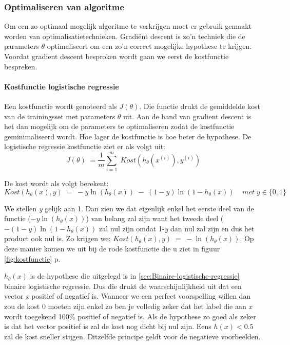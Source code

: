 \subsubsection{Optimaliseren van algoritme}
\label{sec:Optimaliseren-algoritme}
Om een zo optimaal mogelijk algoritme te verkrijgen moet er gebruik gemaakt worden van optimalisatietechnieken. Gradiënt descent is zo'n techniek die de parameters $\theta$ optimaliseert om een zo'n correct mogelijke hypothese te krijgen. Voordat gradient descent besproken wordt gaan we eerst de kostfunctie bespreken. 

\paragraph{Kostfunctie logistische regressie}
\label{par:kostfunctie-log}
Een kostfunctie wordt genoteerd als $J(\theta)$. Die functie drukt de gemiddelde kost van de trainingsset met parameters $\theta$ uit. Aan de hand van gradient descent is het dan mogelijk om de parameters te optimaliseren zodat de kostfunctie geminimaliseerd wordt. Hoe lager de kostfunctie is hoe beter de hypothese.
De logistische regressie kostfunctie ziet er als volgt uit: 
$$ 
J(\theta) \; = \frac{1}{m}\sum_{i=1}^{m} \;   Kost (h_{\theta}(x^{(i)}), y^{(i)} )  
$$

De kost wordt als volgt berekent:
$$Kost (h_{\theta}(x), y) \; = \; -y\ln(h_{\theta}(x)) \;- \;(1-y) \ln(1-h_{\theta}(x))  \;\;\;\; met \; y \in \{0,1\}$$

We stellen \textit{y} gelijk aan 1. Dan zien we dat eigenlijk enkel het eerste deel van de functie ($-y\ln(h_{\theta}(x))$) van belang zal zijn want het tweede deel ($- (1-y) \ln(1-h_{\theta}(x))$ zal nul zijn omdat 1-\textit{y} dan nul zal zijn en dus het product ook nul is. Zo krijgen we: 
\newline $Kost (h_{\theta}(x), y) \; = \; -\ln(h_{\theta}(x))$. Op deze manier komen we uit bij de rode kostfunctie die u ziet in figuur \ref{fig:kostfunctie} p\pageref{fig:kostfunctie}.

$h_{\theta}(x)$ is de hypothese die uitgelegd is in \ref{sec:Binaire-logistische-regressie} binaire logistische regressie. Dus die drukt de waarschijnlijkheid uit dat een vector \textit{x} positief of negatief is. Wanneer we een perfect voorspelling willen dan zou de kost 0 moeten zijn enkel zo ben je volledig zeker dat het label die aan \textit{x} wordt toegekend 100\% positief of negatief is. Als de hypothese zo goed als zeker is dat het vector positief is zal de kost nog dicht bij nul zijn. Eens $h(x) < 0.5$ zal de kost sneller stijgen. Ditzelfde principe geldt voor de negatieve voorbeelden. 


